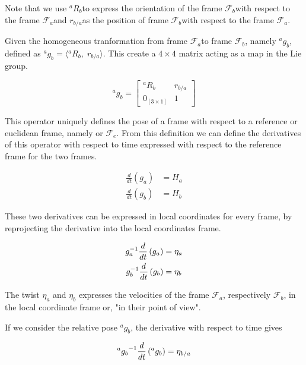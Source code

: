 \documentclass[12pt,a4paper]{book}
\newcommand{\Fa}{\ensuremath{\mathcal{F}_a}}
\newcommand{\Fb}{\ensuremath{\mathcal{F}_b}}
\newcommand{\Fe}{\ensuremath{\mathcal{F}_e}}
\newcommand{\agb}{\ensuremath{{^a g _b}}}
\newcommand{\aRb}{\ensuremath{{^a R _b}}}
\newcommand{\rba}{\ensuremath{{r_{b/a}}}}
\begin{document}
Note that we use \aRb to express the orientation of the frame \Fb with respect to the frame \Fa and \rba as the position of frame \Fb with respect to the frame \Fa.

Given the homogeneous tranformation from frame \Fa to frame \Fb, namely \agb, defined as $\agb = \langle \aRb,\; \rba \rangle$. This create a $4 \times 4$ matrix acting as a map in the Lie group.



\begin{equation}
	\agb = 
	\begin{bmatrix}
		\aRb			&	\rba	\\
		0_{[3\times1]}	&	1
	\end{bmatrix}
\end{equation}

This operator uniquely defines the pose of a frame with respect to a reference or euclidean frame, namely \Fw or \Fe.
From this definition we can define the derivatives of this operator with respect to time expressed with respect to the reference frame for the two frames.

\begin{equation}
\begin{aligned}
	\frac{d}{dt}\left( g_a \right) &= H_{a} \\
	\frac{d}{dt}\left( g_b \right) &= H_{b}
\end{aligned}
\end{equation}

These two derivatives can be expressed in local coordinates for every frame, by reprojecting the derivative into the local coordinates frame.

\begin{equation}
\begin{aligned}
	g_a ^{-1} \frac{d}{dt}\left( g_a \right) &= \eta_{a} \\
	g_b ^{-1} \frac{d}{dt}\left( g_b \right) &= \eta_{b}
\end{aligned}
\end{equation}

The twist $\eta_{a}$ and $\eta_{b}$ expresses the velocities of the frame \Fa{}, respectively \Fb{}, in the local coordinate frame or, "in their point of view".

If we consider the relative pose \agb{}, the derivative with respect to time gives 

\begin{equation}
	\agb \inv \frac{d}{dt}\left( \agb \right) = \eta	_{b/a}
\end{equation}
\end{document}
